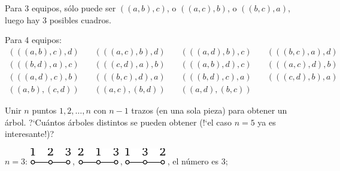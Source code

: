 \documentclass[12pt, spanish]{article}  %
\begin{document}
Para 3 equipos, s\'olo puede ser $((a,b),c)$, o $((a,c),b)$, o $((b,c),a)$, luego hay 3 posibles cuadros.

Para 4 equipos:
$$\begin{array}{cccc}
(((a,b),c),d) & \quad (((a,c),b),d) & \quad (((a,d),b),c) & \quad (((b,c),a),d) \\
(((b,d),a),c) & \quad (((c,d),a),b) & \quad (((a,b),d),c) & \quad (((a,c),d),b) \\ 
(((a,d),c),b) & \quad (((b,c),d),a) & \quad (((b,d),c),a) & \quad (((c,d),b),a) \\
((a,b),(c,d)) & \quad ((a,c),(b,d)) & \quad ((a,d),(b,c))
\end{array}$$

\bigskip
{} Unir $n$ puntos $1, 2, \dots, n$ con $n-1$ trazos (en una sola pieza) para obtener un \'arbol. ?`Cu\'antos \'arboles distintos se pueden obtener (!`el caso $n=5$ ya es interesante!)?
 
\medskip

\medskip
$n=3$:\quad 
\includegraphics{taskbook-292}\,,\quad 
\includegraphics{taskbook-293}\,,\quad 
\includegraphics{taskbook-294}\,,\quad 
el n\'umero es 3;
\end{document}
